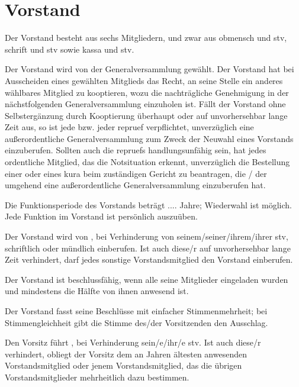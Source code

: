 \documentclass{article}
\begin{document}
\section{Vorstand}\label{vorstand}
\begin{absatz}
    \item Der Vorstand besteht aus sechs Mitgliedern, und zwar aus \gls{obmensch} und \gls{stv}, \gls{schrift} und \gls{stv} sowie \gls{kassa} und \gls{stv}.
    \item \label{vorstand-wahl} Der Vorstand wird von der Generalversammlung gewählt. Der Vorstand hat bei Ausscheiden eines gewählten Mitglieds das Recht, an seine Stelle ein anderes wählbares Mitglied zu kooptieren, wozu die nachträgliche Genehmigung in der nächstfolgenden Generalversammlung einzuholen ist. Fällt der Vorstand ohne Selbstergänzung durch Kooptierung überhaupt oder auf unvorhersehbar lange Zeit aus, so ist jede bzw. jeder \gls{repruef} verpflichtet, unverzüglich eine außerordentliche Generalversammlung zum Zweck der Neuwahl eines Vorstands einzuberufen. Sollten auch die \glspl{repruef} handlungsunfähig sein, hat jedes ordentliche Mitglied, das die Notsituation erkennt, unverzüglich die Bestellung einer oder eines \gls{kura} beim zuständigen Gericht zu beantragen, die / der umgehend eine außerordentliche Generalversammlung einzuberufen hat.
    \item \label{vorstand-periode} Die Funktionsperiode des Vorstands beträgt
     ....  Jahre; Wiederwahl ist möglich. Jede Funktion im Vorstand ist persönlich auszuüben.
     \item Der Vorstand wird von , bei Verhinderung von seinem/seiner/ihrem/ihrer \gls{stv}, schriftlich oder mündlich einberufen. Ist auch diese/r auf unvorhersehbar lange Zeit verhindert, darf jedes sonstige Vorstandsmitglied den Vorstand einberufen.
     \item Der Vorstand ist beschlussfähig, wenn alle seine Mitglieder eingeladen wurden und mindestens die Hälfte von ihnen anwesend ist.
     \item Der Vorstand fasst seine Beschlüsse mit einfacher Stimmenmehrheit; bei Stimmengleichheit gibt die Stimme des/der Vorsitzenden den Ausschlag.
     \item Den Vorsitz führt , bei Verhinderung sein/e/ihr/e \gls{stv}. Ist auch diese/r verhindert, obliegt der Vorsitz dem an Jahren ältesten anwesenden Vorstandsmitglied oder jenem Vorstandsmitglied, das die übrigen Vorstandsmitglieder mehrheitlich dazu bestimmen.

\end{absatz}
\end{document}
